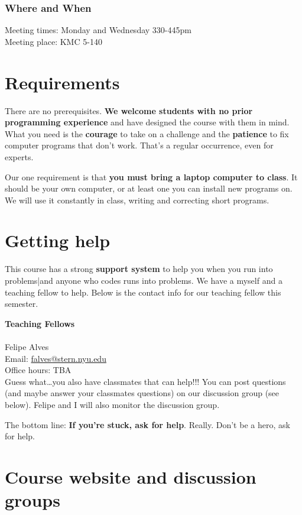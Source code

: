 \subsubsection*{Where and When}
Meeting times: Monday and Wednesday 330-445pm\\

Meeting place: KMC 5-140

\section*{Requirements}

There are no prerequisites.
{\bf We welcome students with no prior programming experience\/}
and have designed the course with them in mind.
What you need is the {\bf courage\/} to take on a challenge
and the {\bf patience\/} to fix computer programs that don't work.
That's a regular occurrence, even for experts.

Our one requirement is that {\bf you must bring a laptop computer to class\/}.
It should be your own computer, or at least one you can install new programs on.
We will use it constantly in class, writing and correcting short programs.


\section*{Getting help}

This course has a strong {\bf support system\/} to help you when you run into problems|and anyone who codes runs into problems. We have a myself and a teaching fellow to help. Below is the contact info for our teaching fellow this semester.

\textbf{Teaching Fellows}\\
\\
Felipe Alves \\
Email: \href{mailto:mailto:falves@stern.nyu.edu}{falves@stern.nyu.edu}\\
Office hours: TBA\\

Guess what\ldots you also have classmates that can help!!! You can post questions (and maybe answer your classmates questions) on our discussion group (see below). Felipe and I will also monitor the discussion group.

The bottom line:  {\bf If you're stuck, ask for help\/}.
Really.  Don't be a hero, ask for help.



\section*{Course website and discussion groups}

